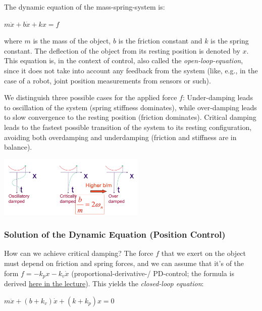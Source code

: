 The dynamic equation of the mass-spring-system is:

\begin{center}
	$m \ddot{x}+b \dot{x}+k x=f$
\end{center}

where $m$ is the mass of the object, $b$ is the friction constant and $k$ is the spring constant. The deflection of the object from its resting position is  denoted by $x$. This equation is, in the context of control, also called the \textit{open-loop-equation}, since it does not take into account any feedback from the system (like, e.g., in the case of a robot, joint position measurements from sensors or such).

We distinguish three possible cases for the applied force $f$: Under-damping leads to oscillation of the system (spring stiffness dominates), while over-damping leads to slow convergence to the resting position (friction dominates). Critical damping leads to the fastest possible transition of the system to its resting configuration, avoiding both overdamping and underdamping (friction and stiffness are in balance).

\begin{center}
	\includegraphics[width=7cm]{sections/imgs/7_critically_damped.png}
\end{center}

\subsubsection{Solution of the Dynamic Equation (Position Control)}

How can we achieve critical damping? The force $f$ that we exert on the object must depend on friction and spring forces, and we can assume that it’s of the form $f=-k_{p} x-k_{v} \dot{x}$ (proportional-derivative-/ PD-control; the formula is derived \href{https://youtu.be/5-k2RzfIgoU?t=3514}{here in the lecture}). This yields the \textit{closed-loop equation}:

\begin{center}
	$m \ddot{x}+\left(b+k_{v}\right) \dot{x}+\left(k+k_{p}\right) x=0$
\end{center}


